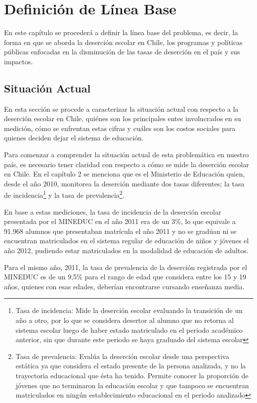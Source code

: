 \chapter{Definición de Línea Base}
\label{ch:lineabase}

En este capítulo se procederá a definir la línea base del problema, es decir, la forma en que se aborda la deserción escolar en Chile, los programas y políticas públicas enfocadas en la disminución de las tasas de deserción en el país y sus impactos.

\section{Situación Actual}
En esta sección se procede a caracterizar la situación actual con respecto a la deserción escolar en Chile, quiénes son los principales entes involucrados en su medición, cómo se enfrentan estas cifras y cuáles son los costos sociales para quienes deciden dejar el sistema de educación.

Para comenzar a comprender la situación actual de esta problemática en nuestro país, es necesario tener claridad con respecto a cómo se mide la deserción escolar en Chile. En el capítulo 2 se menciona que es el Ministerio de Educación quien, desde el año 2010, monitorea la deserción mediante dos tasas diferentes; la tasa de incidencia\footnote{Tasa de incidencia: Mide la deserción escolar evaluando la transición de un año a otro, por lo que se considera desertor al alumno que no retorna al sistema escolar luego de haber estado matriculado en el periodo académico anterior, sin que durante este periodo se haya graduado del sistema escolar} y la tasa de prevalencia\footnote{Tasa de prevalencia: Evalúa la deserción escolar desde una perspectiva estática ya que considera el estado presente de la persona analizada, y no la trayectoria educacional que ésta  ha  tenido. Permite conocer la proporción de jóvenes que no terminaron la educación escolar y que tampoco se encuentran matriculados en ningún establecimiento educacional en el periodo analizado}.

En base a estas mediciones, la tasa de incidencia de la deserción escolar presentada por el MINEDUC en el año 2011 era de un 3\%, lo que equivale a 91.968 alumnos que presentaban matrícula el año 2011 y no se gradúan ni se encuentran matriculados en el sistema regular de educación de niños y jóvenes el año 2012, pudiendo estar matriculados en la modalidad de educación de adultos. 

Para el mismo año, 2011, la tasa de prevalencia de la deserción registrada por el MINEDUC es de un 9,5\% para el rango de edad que considera entre los 15 y 19 años, quienes con esas edades, deberían encontrarse cursando enseñanza media. 

